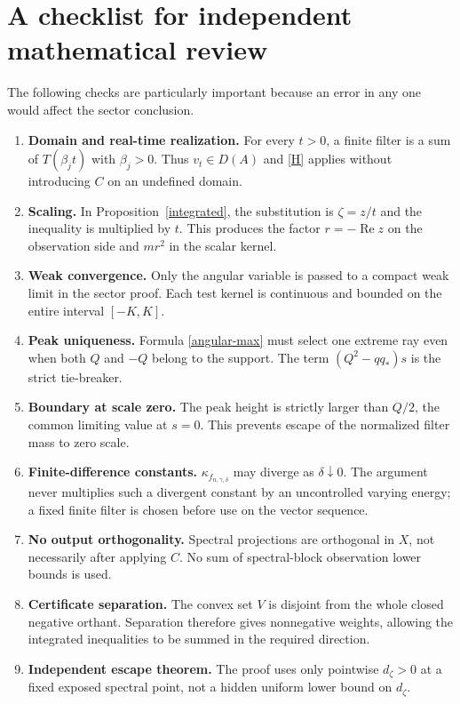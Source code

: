 \documentclass[11pt,a4paper]{article}
\theoremstyle{definition}\newtheorem{definition}[theorem]{Definition}
\theoremstyle{remark}\newtheorem{remark}[theorem]{Remark}
\DeclareMathOperator{\Rea}{Re}\DeclareMathOperator{\Ima}{Im}
\begin{document}
\section{A checklist for independent mathematical review}
The following checks are particularly important because an error in any one would affect the sector conclusion.
\begin{enumerate}[label=\arabic*.]
\item \textbf{Domain and real-time realization.} For every $t>0$, a finite filter is a sum of $T(\beta_jt)$ with $\beta_j>0$. Thus $v_t\in D(A)$ and \eqref{H} applies without introducing $C$ on an undefined domain.
\item \textbf{Scaling.} In Proposition~\ref{integrated}, the substitution is $\zeta=z/t$ and the inequality is multiplied by $t$. This produces the factor $r=-\Rea z$ on the observation side and $mr^2$ in the scalar kernel.
\item \textbf{Weak convergence.} Only the angular variable is passed to a compact weak limit in the sector proof. Each test kernel is continuous and bounded on the entire interval $[-K,K]$.
\item \textbf{Peak uniqueness.} Formula \eqref{angular-max} must select one extreme ray even when both $Q$ and $-Q$ belong to the support. The term $(Q^2-q q_*)s$ is the strict tie-breaker.
\item \textbf{Boundary at scale zero.} The peak height is strictly larger than $Q/2$, the common limiting value at $s=0$. This prevents escape of the normalized filter mass to zero scale.
\item \textbf{Finite-difference constants.} $\kappa_{f_{n,\gamma,\delta}}$ may diverge as $\delta\downarrow0$. The argument never multiplies such a divergent constant by an uncontrolled varying energy; a fixed finite filter is chosen before use on the vector sequence.
\item \textbf{No output orthogonality.} Spectral projections are orthogonal in $X$, not necessarily after applying $C$. No sum of spectral-block observation lower bounds is used.
\item \textbf{Certificate separation.} The convex set $V$ is disjoint from the whole closed negative orthant. Separation therefore gives nonnegative weights, allowing the integrated inequalities to be summed in the required direction.
\item \textbf{Independent escape theorem.} The proof uses only pointwise $d_\zeta>0$ at a fixed exposed spectral point, not a hidden uniform lower bound on $d_\zeta$.
\end{enumerate}
\end{document}
